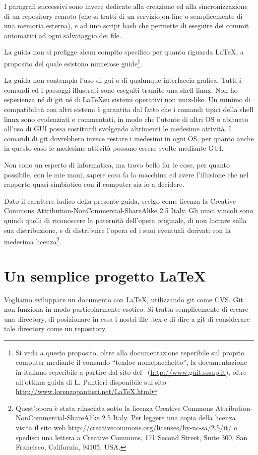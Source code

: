 \documentclass[a4paper,12pt,oneside]{article}
\begin{document}
I paragrafi successivi sono invece dedicate alla creazione ed alla
sincronizzazione di un repository remoto (che si tratti di un servizio on-line
o semplicemente di una memoria esterna), e ad uno script bash che permette di
eseguire dei commit automatici ad ogni salvataggio dei file.

La guida non si prefigge alcun compito specifico per quanto riguarda \LaTeX, a
proposito del quale esistono numerose guide\footnote{Si veda a questo proposito,
oltre alla documentazione reperibile sul proprio computer mediante il comando
``texdoc nomepacchetto'', la documentazione in italiano reperibile a partire dal
sito del \guit\ (\url{http://www.guit.sssup.it}), oltre all'ottima guida di L. Pantieri
disponibile sul sito \url{http://www.lorenzopantieri.net/LaTeX.html}}.

La guida non contempla l'uso di gui o di qualunque interfaccia grafica. Tutti i
comandi ed i passaggi illustrati sono eseguiti tramite una shell linux.
Non ho esperienza né di git né di \LaTeX su sistemi operativi non
unix-like. Un minimo di compatibilità con altri sistemi è garantita dal fatto
che i comandi tipici della shell linux sono evidenziati e commentati, in modo
che l'utente di altri OS o abituato all'uso di GUI possa sostituirli svolgendo
altrimenti le medesime attività. I comandi di git dovrebbero invece restare i
medesimi in ogni OS, per quanto anche in questo caso le medesime attività
possano essere svolte mediante GUI.

Non sono un esperto di informatica, ma trovo bello far le cose, per quanto
possibile, con le mie mani, sapere cosa fa la macchina ed avere l'illusione che
nel rapporto quasi-simbiotico con il computer sia io a decidere.

Dato il carattere ludico della presente guida, scelgo come licenza la Creative
Commons Attribution-NonCommercial-ShareAlike 2.5 Italy. Gli unici vincoli sono
quindi quelli di riconoscere la paternità dell'opera
originale, di non lucrare sulla sua distribuzione, e di distribuire l'opera ed
i suoi eventuali derivati con la medesima licenza\footnote{
Quest'opera è stata rilasciata sotto la licenza
Creative Commons Attribution-NonCommercial-ShareAlike 2.5 Italy.
Per leggere una copia della licenza visita il sito web
\url{http://creativecommons.org/licenses/by-nc-sa/2.5/it/}
o spedisci una lettera a Creative Commons, 171 Second Street, Suite 300, San
Francisco, California, 94105, USA.}.

\section{Un semplice progetto \LaTeX}
Vogliamo sviluppare un documento con \LaTeX, utilizzando git come CVS.
Git non funziona in modo particolarmente esotico. Si tratta semplicemente di
creare una directory, di posizionare in essa i nostri file .tex e di dire a git
di considerare tale directory come un repository.
\end{document}
